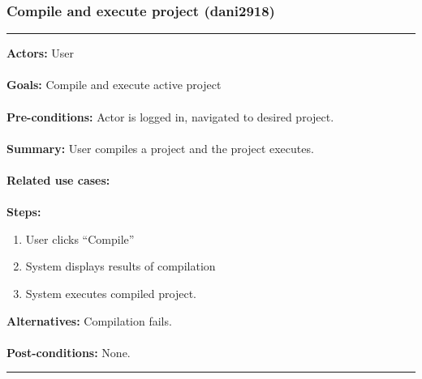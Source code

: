 \documentclass[11pt]{report}
\begin{document}
\subsubsection{Compile and execute project (dani2918)}
\vspace{2pt}
\hrule
\vspace{8pt}
 \textbf{Actors:} User \\ \\
\textbf{Goals:} Compile and execute active project\\ \\
 \textbf{Pre-conditions:} Actor is logged in, navigated to desired project.  \\ \\
\textbf{Summary:} User compiles a project and the project executes.\\ \\
\textbf{Related use cases:} \\ \\
\textbf{Steps:} \begin{enumerate}
  \item User clicks ``Compile''
  \item System displays results of compilation
  \item System executes compiled project.
 \end{enumerate}
 \textbf{Alternatives:} Compilation fails. \\ \\
 \textbf{Post-conditions:} None. \\
\vspace{8pt}
\hrule
\newpage
\end{document}
